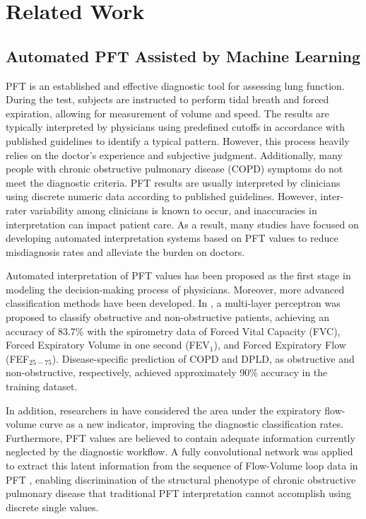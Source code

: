 \documentclass[journal,twoside,web]{ieeecolor}
\begin{document}
\section{Related Work}
\label{secA}
\subsection{Automated PFT Assisted by Machine Learning }
PFT is an established and effective diagnostic tool for assessing lung function. During the test, subjects are instructed to perform tidal breath and forced expiration, allowing for measurement of volume and speed. The results are typically interpreted by physicians using predefined cutoffs in accordance with published guidelines\cite{pellegrino2005interpretative} to identify a typical pattern. However, this process heavily relies on the doctor's experience and subjective judgment\cite{topalovic2019artificial}. Additionally, many people with chronic obstructive pulmonary disease (COPD) symptoms do not meet the diagnostic criteria\cite{keener2020redefining,miller2011interpreting}. PFT results are usually interpreted by clinicians using discrete numeric data according to published guidelines. However, inter-rater variability among clinicians is known to occur, and inaccuracies in interpretation can impact patient care. As a result, many studies have focused on developing automated interpretation systems based on PFT values to reduce misdiagnosis rates and alleviate the burden on doctors.

Automated interpretation of PFT values has been proposed as the first stage in modeling the decision-making process of physicians\cite{topalovic2017automated, delclaux2019no, topalovic2019artificial,5478898}. Moreover, more advanced classification methods have been developed. In \cite{bhattacharjee2022classification}, a multi-layer perceptron was proposed to classify obstructive and non-obstructive patients, achieving an accuracy of 83.7\% with the spirometry data of Forced Vital Capacity (FVC), Forced Expiratory Volume in one second (FEV$_{1}$), and Forced Expiratory Flow (FEF$_{25-75}$). Disease-specific prediction of COPD and DPLD, as obstructive and non-obstructive, respectively, achieved approximately 90\% accuracy in the training dataset.

In addition, researchers in \cite{ioachimescu2020alternative} have considered the area under the expiratory flow-volume curve as a new indicator, improving the diagnostic classification rates. Furthermore, PFT values are believed to contain adequate information currently neglected by the diagnostic workflow. A fully convolutional network was applied to extract this latent information from the sequence of Flow-Volume loop data in PFT \cite{bodduluri2020deep}, enabling discrimination of the structural phenotype of chronic obstructive pulmonary disease that traditional PFT interpretation cannot accomplish using discrete single values.
\end{document}
